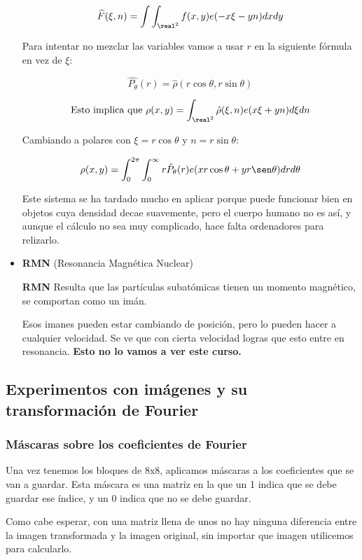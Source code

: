 \begin{itemize}
	$$\widehat{F}(\xi , n) = \int \int_{\real^2} f(x,y) e (-x\xi -yn) dxdy$$

	Para intentar no mezclar las variables vamos a usar $r$ en la siguiente fórmula en vez de $\xi$:

	$$\hat{P_{\theta}} (r) = \hat{\rho} (r \cos \theta, r \sin \theta)$$

	$$ \text{Esto implica que } \rho (x,y) = \int_{\real^2} \hat{\rho}(\xi, n) e(x \xi + yn) d\xi dn $$

	Cambiando a polares con $\xi = r \cos \theta$ y $n = r \sin \theta$:

	$$ \rho (x,y) = \int^{2\pi}_{0} \int^{\infty}_{0} r \hat{P}_{\theta} (r) e (x r \cos \theta + y r \sen \theta) dr d\theta $$

	Este sistema se ha tardado mucho en aplicar porque puede funcionar bien en objetos cuya densidad decae suavemente, pero el cuerpo humano no es así, y aunque el cálculo no sea muy complicado, hace falta ordenadores para relizarlo.
	\item \textbf{RMN} (Resonancia Magnética Nuclear)

	\textbf{RMN} Resulta que las partículas subatómicas tienen un momento magnético, se comportan como un imán.

	Esos imanes pueden estar cambiando de posición, pero lo pueden hacer a cualquier velocidad. Se ve que con cierta velocidad logras que esto entre en resonancia. \textbf{Esto no lo vamos a ver este curso.}
\end{itemize}








\subsection{Experimentos con imágenes y su transformación de Fourier}

	\subsubsection{Máscaras sobre los coeficientes de Fourier}

		Una vez tenemos los bloques de 8x8, aplicamos máscaras a los coeficientes que se van a guardar. Esta máscara es una matriz en la que un 1 indica que se debe guardar ese índice, y un 0 indica que no se debe guardar.

		Como cabe esperar, con una matriz llena de unos no hay ninguna diferencia entre la imagen transformada y la imagen original, sin importar que imagen utilicemos para calcularlo.

